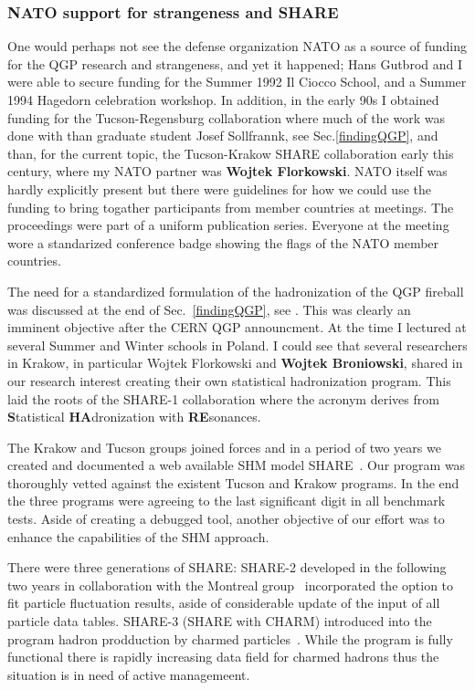 \subsubsection{NATO support for strangeness and SHARE}\label{ss:SHARE}
\label{diabolicum}
One would perhaps not see the defense organization NATO\label{NATOfun} as a source of funding for the QGP research and strangeness, and yet it happened; Hans Gutbrod and I were able to secure funding for the Summer 1992 Il Ciocco School, and a Summer 1994 Hagedorn celebration workshop. In addition, in the early 90s I obtained funding for the Tucson-Regensburg collaboration where much of the work was done with than graduate student Josef Sollfrannk, see Sec.\ref{findingQGP}, and than, for the current topic, the Tucson-Krakow SHARE collaboration early this century, where my NATO partner was \textbf{Wojtek Florkowski}. NATO itself was hardly explicitly present but there were guidelines for how we could use the funding to bring togather participants from member countries at meetings. The proceedings were part of a uniform publication series. Everyone at the meeting wore a standarized conference badge showing the flags of the NATO member countries.

The need for a standardized formulation of the hadronization of the QGP fireball was discussed at the end of Sec.~\ref{findingQGP}, see . This was clearly an imminent objective after the CERN QGP announcment. At the time I lectured at several Summer and Winter schools in Poland. I could see that several researchers in Krakow, in particular Wojtek Florkowski and \textbf{Wojtek Broniowski}, shared in our research interest creating their own statistical hadronization program. This laid the roots of the SHARE-1 collaboration where the acronym derives from {\bf S}tatistical {\bf HA}dronization with {\bf RE}sonances.

The Krakow and Tucson groups joined forces and in a period of two years we created and documented a web available SHM model SHARE~\cite{Torrieri:2004zz}. Our program was thoroughly vetted against the existent Tucson and Krakow programs. In the end the three programs were agreeing to the last significant digit in all benchmark tests. Aside of creating a debugged tool, another objective of our effort was to enhance the capabilities of the SHM approach. 

There were three generations of SHARE: SHARE-2 developed in the following two years in collaboration with the Montreal group~\cite{Torrieri:2006xi} incorporated the option to fit particle fluctuation results, aside of considerable update of the input of all particle data tables. SHARE-3 (SHARE with CHARM) introduced into the program hadron prodduction by charmed particles~\cite{Petran:2013dva}. While the program is fully functional there is rapidly increasing data field for charmed hadrons thus the situation is in need of active managemeent.

